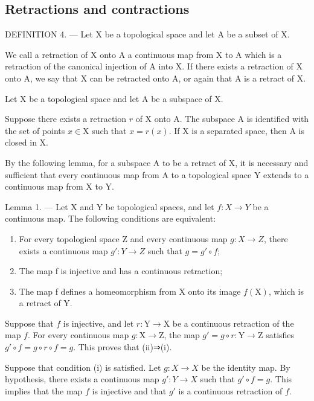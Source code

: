 \subsection{Retractions and contractions}

DEFINITION 4. --- Let X be a topological space and let A be a subset of X.

We call a retraction of X onto A a continuous map from X to A which is a retraction of the canonical injection of A into X. If there exists a retraction of X onto A, we say that X can be retracted onto A, or again that A is a retract of X.

Let X be a topological space and let A be a subspace of X.

Suppose there exists a retraction \(r\) of X onto A. The subspace A is identified with the set of points \(x \in \mathrm{X}\) such that \(x = r(x)\). If X is a separated space, then A is closed in X.

By the following lemma, for a subspace A to be a retract of X, it is necessary and sufficient that every continuous map from A to a topological space Y extends to a continuous map from X to Y.

Lemma 1. --- Let X and Y be topological spaces, and let \(f\colon X\to Y\) be a continuous map. The following conditions are equivalent:

\begin{enumerate}
\def\labelenumi{(\roman{enumi})}
\item
  For every topological space Z and every continuous map \(g: X \to Z\), there exists a continuous map \(g': Y \to Z\) such that \(g = g' \circ f\);
\item
  The map f is injective and has a continuous retraction;
\item
  The map f defines a homeomorphism from X onto its image \(f(\mathrm{X})\), which is a retract of Y.
\end{enumerate}

Suppose that \(f\) is injective, and let \(r: \mathrm{Y} \to \mathrm{X}\) be a continuous retraction of the map \(f\). For every continuous map \(g: \mathrm{X} \to \mathrm{Z}\), the map \(g' = g \circ r: \mathrm{Y} \to \mathrm{Z}\) satisfies \(g' \circ f = g \circ r \circ f = g\). This proves that (ii)⇒(i).

Suppose that condition (i) is satisfied. Let \(g \colon X \to X\) be the identity map. By hypothesis, there exists a continuous map \(g' \colon Y \to X\) such that \(g' \circ f = g\). This implies that the map \(f\) is injective and that \(g'\) is a continuous retraction of \(f\).

